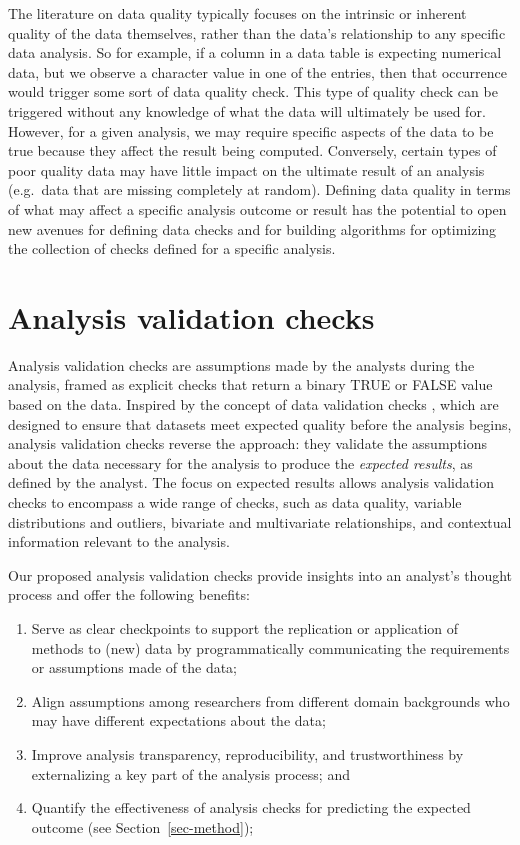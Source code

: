 \documentclass[
  12pt,
]{interact}
\providecommand{\tightlist}{%
  \setlength{\itemsep}{0pt}\setlength{\parskip}{0pt}}\usepackage{longtable,booktabs,array}
\begin{document}
The literature on data quality typically focuses on the intrinsic or
inherent quality of the data themselves, rather than the data's
relationship to any specific data analysis. So for example, if a column
in a data table is expecting numerical data, but we observe a character
value in one of the entries, then that occurrence would trigger some
sort of data quality check. This type of quality check can be triggered
without any knowledge of what the data will ultimately be used for.
However, for a given analysis, we may require specific aspects of the
data to be true because they affect the result being computed.
Conversely, certain types of poor quality data may have little impact on
the ultimate result of an analysis (e.g.~data that are missing
completely at random). Defining data quality in terms of what may affect
a specific analysis outcome or result has the potential to open new
avenues for defining data checks and for building algorithms for
optimizing the collection of checks defined for a specific analysis.

\section{Analysis validation checks}\label{sec-plan}

Analysis validation checks are assumptions made by the analysts during
the analysis, framed as explicit checks that return a binary TRUE or
FALSE value based on the data. Inspired by the concept of data
validation checks \citep{validate}, which are designed to ensure that
datasets meet expected quality before the analysis begins, analysis
validation checks reverse the approach: they validate the assumptions
about the data necessary for the analysis to produce the \emph{expected
results}, as defined by the analyst. The focus on expected results
allows analysis validation checks to encompass a wide range of checks,
such as data quality, variable distributions and outliers, bivariate and
multivariate relationships, and contextual information relevant to the
analysis.

Our proposed analysis validation checks provide insights into an
analyst's thought process and offer the following benefits:

\begin{enumerate}
\def\labelenumi{\arabic{enumi}.}
\tightlist
\item
  Serve as clear checkpoints to support the replication or application
  of methods to (new) data by programmatically communicating the
  requirements or assumptions made of the data;
\item
  Align assumptions among researchers from different domain backgrounds
  who may have different expectations about the data;
\item
  Improve analysis transparency, reproducibility, and trustworthiness by
  externalizing a key part of the analysis process; and
\item
  Quantify the effectiveness of analysis checks for predicting the
  expected outcome (see Section~\ref{sec-method});
\end{enumerate}
\end{document}
